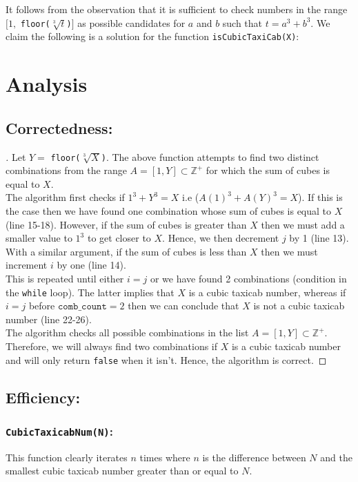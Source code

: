 \documentclass[11pt]{report}
\begin{document}
It follows from the observation that it is sufficient to check numbers in the range $[1,$ \texttt{floor($\sqrt[3]{t}$)}$]$ as possible candidates for $a$ and $b$ such that $t=a^3+b^3$. We claim the following is a solution for the function \texttt{isCubicTaxiCab(X)}: \\



\section{Analysis}
\subsection{Correctedness:}
\begin{proof}[\unskip\nopunct]
Let $Y=$ \texttt{floor($\sqrt[3]{X}$)}. The above function attempts to find two distinct combinations from the range $A=[1,Y]\subset \mathbb{Z^+}$ for which the sum of cubes is equal to $X$. \\ 

The algorithm first checks if $1^3+Y^3=X$ i.e ($A(1)^3+A(Y)^3 = X$). If this is the case then we have found one combination whose sum of cubes is equal to $X$ (line 15-18). However, if the sum of cubes is greater than $X$ then we must add a smaller value to $1^3$ to get closer to $X$. Hence, we then decrement $j$ by 1 (line 13). With a similar argument, if the sum of cubes is less than $X$ then we must increment $i$ by one (line 14). \\

This is repeated until either $i=j$ or we have found 2 combinations (condition in the \texttt{while} loop). The latter implies that $X$ is a cubic taxicab number, whereas if $i=j$ before $\texttt{comb\_count}=2$ then we can conclude that $X$ is not a cubic taxicab number (line 22-26). \\

The algorithm checks all possible combinations in the list $A = [1,Y] \subset \mathbb{Z^+}$. Therefore, we will always find two combinations if $X$ is a cubic taxicab number and will only return \texttt{false} when it isn't. Hence, the algorithm is correct.
\end{proof}

\subsection{Efficiency:}
\subsubsection{\texttt{CubicTaxicabNum(N)}:}
This function clearly iterates $n$ times where $n$ is the difference between $N$ and the smallest cubic taxicab number greater than or equal to $N$.
\end{document}
